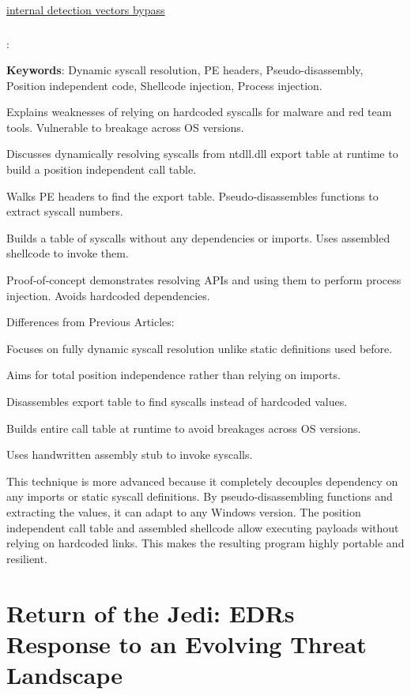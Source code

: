\documentclass{article}
\begin{document}
\href{https://www.unknowncheats.me/forum/anti-cheat-bypass/286274-internal-detection-vectors-bypass.html}{internal detection vectors bypass}


\subsubsection{\textcite{smellyvx:2021}}

\textbf{}:

\textbf{Keywords}:  Dynamic syscall resolution, PE headers, Pseudo-disassembly, Position independent code, Shellcode injection, Process injection.

Explains weaknesses of relying on hardcoded syscalls for malware and red team tools. Vulnerable to breakage across OS versions.

Discusses dynamically resolving syscalls from ntdll.dll export table at runtime to build a position independent call table.

Walks PE headers to find the export table. Pseudo-disassembles functions to extract syscall numbers.

Builds a table of syscalls without any dependencies or imports. Uses assembled shellcode to invoke them.

Proof-of-concept demonstrates resolving APIs and using them to perform process injection. Avoids hardcoded dependencies.

Differences from Previous Articles:

Focuses on fully dynamic syscall resolution unlike static definitions used before.

Aims for total position independence rather than relying on imports.

Disassembles export table to find syscalls instead of hardcoded values.

Builds entire call table at runtime to avoid breakages across OS versions.

Uses handwritten assembly stub to invoke syscalls.

This technique is more advanced because it completely decouples dependency on any imports or static syscall definitions. By pseudo-disassembling functions and extracting the values, it can adapt to any Windows version. The position independent call table and assembled shellcode allow executing payloads without relying on hardcoded links. This makes the resulting program highly portable and resilient.



\section{Return of the Jedi: EDRs Response to an Evolving Threat Landscape}
\end{document}
